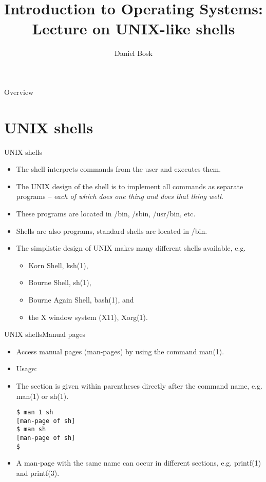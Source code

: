 \documentclass{beamer}
\title[UNIX]{%
	Introduction to Operating Systems:\\
	Lecture on UNIX-like shells
}
\author{Daniel Bosk}
\institute{%
	Department of Information Technology and Media (ITM),\\
	Mid Sweden University, Sundsvall.
}
\date{\svnId}
\begin{document}
\begin{frame}
  \titlepage
\end{frame}

\begin{frame}{Overview}
	\tableofcontents
\end{frame}





\section{UNIX shells}
\begin{frame}{UNIX shells}
	\begin{itemize}
		\item<1> The shell interprets commands from the user and executes them.
		\item<2> The UNIX design of the shell is to implement all commands as 
			separate programs -- \emph{each of which does one thing and does that 
			thing well}.
		\item<3> These programs are located in /bin, /sbin, /usr/bin, etc.
		\item<4> Shells are also programs, standard shells are located in /bin.
		\item<5> The simplistic design of UNIX makes many different shells 
			available, e.g.
			\begin{itemize}
				\item Korn Shell, ksh(1),
				\item Bourne Shell, sh(1),
				\item Bourne Again Shell, bash(1), and
				\item the X window system (X11), Xorg(1).
			\end{itemize}
	\end{itemize}
\end{frame}
\begin{frame}[fragile]{UNIX shells}{Manual pages}
	\begin{itemize}
		\item<1-2> Access manual pages (man-pages) by using the command man(1).
		\item<2> Usage: 
		\item<3> The section is given within parentheses directly after the command 
			name, e.g. man(1) or sh(1).
			\begin{lstlisting}
$ man 1 sh
[man-page of sh]
$ man sh
[man-page of sh]
$
			\end{lstlisting}
		\item<4> A man-page with the same name can occur in different sections, 
			e.g. printf(1) and printf(3).
	\end{itemize}
\end{frame}
\end{document}
